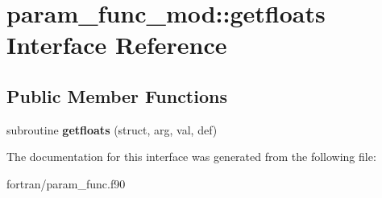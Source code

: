\hypertarget{interfaceparam__func__mod_1_1getfloats}{}\section{param\+\_\+func\+\_\+mod\+:\+:getfloats Interface Reference}
\label{interfaceparam__func__mod_1_1getfloats}
\subsection*{Public Member Functions}
\begin{DoxyCompactItemize}
\item 
\mbox{\label{interfaceparam__func__mod_1_1getfloats_afae8517cf86f659c3282ef939caf5cf7}} 
subroutine {\bfseries getfloats} (struct, arg, val, def)
\end{DoxyCompactItemize}


The documentation for this interface was generated from the following file\+:\begin{DoxyCompactItemize}
\item 
fortran/param\+\_\+func.\+f90\end{DoxyCompactItemize}
